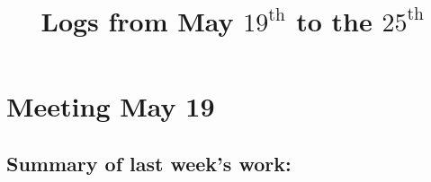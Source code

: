\documentclass[12pt,a4paper]{article}
\title{Logs from May $19^{\text{th}}$ to the $25^{\text{th}}$}
\author{}
\date{}
\begin{document}
\maketitle

\section{Meeting May 19}

\subsection{Summary of last week's work:}




\end{document}
